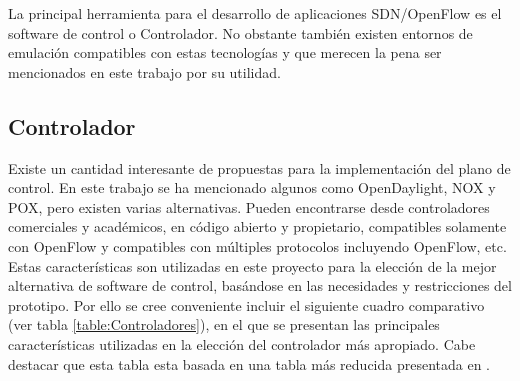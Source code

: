 La principal herramienta para el desarrollo de aplicaciones SDN/OpenFlow es el software de control o Controlador. No obstante también existen entornos de emulación compatibles con estas tecnologías y que merecen la pena ser mencionados en este trabajo por su utilidad.

\subsection{Controlador}
Existe un cantidad interesante de propuestas para la implementaci\'on del plano de control. En este trabajo se ha mencionado algunos como OpenDaylight, NOX y POX, pero existen varias alternativas. Pueden encontrarse desde controladores comerciales y académicos, en código abierto y propietario, compatibles solamente con OpenFlow y compatibles con múltiples protocolos incluyendo OpenFlow, etc.\\   

Estas características son utilizadas en este proyecto para la elección de la mejor alternativa de software de control, basándose en las necesidades y restricciones del prototipo. Por ello se cree conveniente incluir el siguiente cuadro comparativo (ver tabla \ref{table:Controladores}), en el que se presentan las principales características utilizadas en la elecci\'on del controlador m\'as apropiado. Cabe destacar que esta tabla esta basada en una tabla m\'as reducida presentada en \cite{StateOfArt1}.\\

